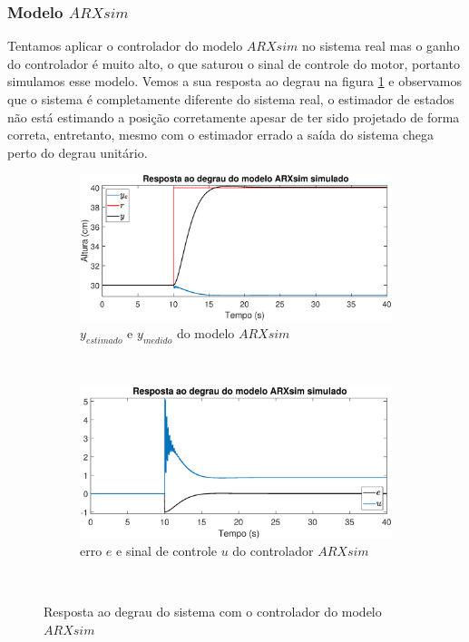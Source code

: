 \subsubsection{Modelo $ARXsim$}

Tentamos aplicar o controlador do modelo $ARXsim$ no sistema real mas o ganho do controlador é muito alto, o que saturou o sinal de controle do motor, portanto simulamos esse modelo. Vemos a sua resposta ao degrau na figura \ref{fig:stepsarxsimy} e observamos que o sistema é completamente diferente do sistema real, o estimador de estados não está estimando a posição corretamente apesar de ter sido projetado de forma correta, entretanto, mesmo com o estimador errado a saída do sistema chega perto do degrau unitário.

\begin{figure}[htb]
	\centering
	\begin{subfigure}[t]{0.48\textwidth}
		\includegraphics[width=1\linewidth]{pasta1_figuras/stepsarxsimy}
		\caption[$y_{estimado}$ e $y_{medido}$ do modelo $ARX2$]{$y_{estimado}$ e $y_{medido}$ do modelo $ARXsim$}
		\label{fig:stepsarxsimy}
	\end{subfigure}
	~ %
	\begin{subfigure}[t]{0.48\textwidth}
		\includegraphics[width=1\linewidth]{pasta1_figuras/stepsarxsime}
		\caption[erro $e$ e sinal de controle $u$ do controlador $ARX2$]{erro $e$ e sinal de controle $u$ do controlador $ARXsim$}
		\label{fig:stepsarxsime}
	\end{subfigure}
	~ %
	
	\caption{Resposta ao degrau do sistema com o controlador do modelo $ARXsim$}\label{fig:stepsarxsim}
\end{figure}

